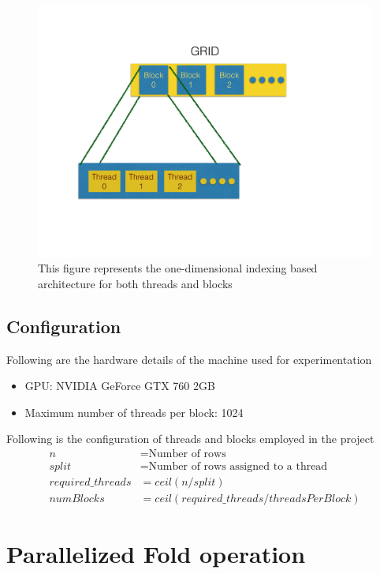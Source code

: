 \documentclass{article}
\begin{document}
\begin{figure}[h]
        \includegraphics[width=\textwidth]{GPU.pdf}
        \caption{This figure represents the one-dimensional indexing based architecture for both threads and blocks}
        \centering
\end{figure}

\subsection*{Configuration}
Following are the hardware details of the machine used for experimentation
\begin{itemize}
    \item GPU: NVIDIA GeForce GTX 760 2GB
    \item Maximum number of threads per block: 1024
\end{itemize}

Following is the configuration of threads and blocks employed in the project
\begin{align*}
        n &= \text{Number of rows}\\
        split &= \text{Number of rows assigned to a thread}\\
        required\_threads &= ceil(n/split)\\
        numBlocks &= ceil(required\_threads/threadsPerBlock)
\end{align*}


\section*{Parallelized Fold operation}
\end{document}
